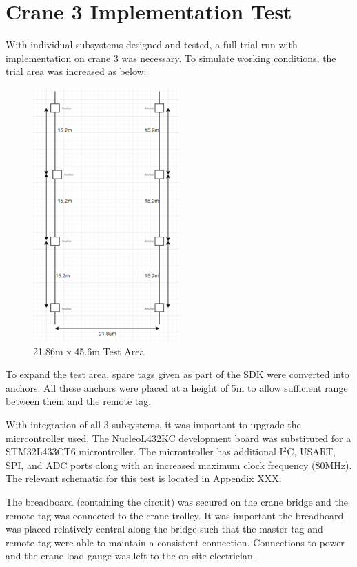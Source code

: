 \documentclass[12pt, a4paper]{article}
\begin{document}
\newpage

\section{Crane 3 Implementation Test}
With individual subsystems designed and tested, a full trial run with implementation on crane 3 was necessary.
To simulate working conditions, the trial area was increased as below:
\begin{figure}[H]
    \centering
    \includegraphics[width=0.5\textwidth]{setup3.png}
    \caption{21.86m x 45.6m Test Area}
    \label{fig:setup3}
\end{figure}
To expand the test area, spare tags given as part of the SDK were converted into anchors. All these anchors were placed at a height of 5m to allow sufficient
range between them and the remote tag.

With integration of all 3 subsystems, it was important to upgrade the micrcontroller used. The NucleoL432KC development board was substituted for a STM32L433CT6 microntroller.
The microntroller has additional I$^2$C, USART, SPI, and ADC ports along with an increased maximum clock frequency (80MHz). The relevant schematic for this test
is located in Appendix XXX.

The breadboard (containing the circuit) was secured on the crane bridge and the remote tag was connected to the crane trolley. It was important the breadboard was placed relatively
central along the bridge such that the master tag and remote tag were able to maintain a consistent connection. Connections to power and the crane load gauge was
left to the on-site electrician.
\end{document}
